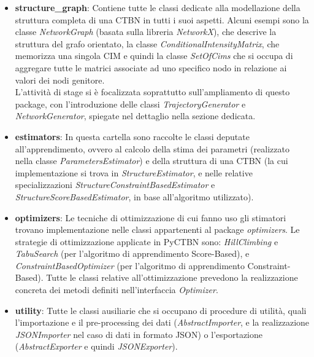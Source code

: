  \begin{itemize}
    \item \textbf{structure\_graph}: Contiene tutte le classi dedicate alla modellazione della struttura completa di una
      CTBN in tutti i suoi aspetti. Alcuni esempi sono la classe \textit{NetworkGraph} (basata sulla libreria \textit{NetworkX}),
      che descrive la struttura del grafo orientato, la classe \textit{ConditionalIntensityMatrix}, che
      memorizza una singola CIM e quindi la classe \textit{SetOfCims} che si occupa di aggregare
      tutte le matrici associate ad uno specifico nodo in relazione ai valori dei nodi genitore.\\
      L'attività di stage si è focalizzata soprattutto sull'ampliamento di questo package, con
      l'introduzione delle classi \textit{TrajectoryGenerator} e \textit{NetworkGenerator}, spiegate nel
      dettaglio nella sezione dedicata.
      
    \item \textbf{estimators}: In questa cartella sono raccolte le classi deputate all'apprendimento,
      ovvero al calcolo della stima dei parametri (realizzato nella classe \textit{ParametersEstimator}) e della struttura di una CTBN
      (la cui implementazione si trova in \textit{StructureEstimator}, e nelle relative specializzazioni \textit{StructureConstraintBasedEstimator} e
      \textit{StructureScoreBasedEstimator}, in base all'algoritmo utilizzato).

    \item \textbf{optimizers}: Le tecniche di ottimizzazione di cui fanno uso gli stimatori trovano
      implementazione nelle classi appartenenti al package \textit{optimizers}. 
      Le strategie di ottimizzazione applicate in PyCTBN sono: \textit{HillClimbing} e \textit{TabuSearch} (per l'algoritmo di apprendimento Score-Based),
      e \textit{ConstraintBasedOptimizer} (per l'algoritmo di apprendimento Constraint-Based). 
      Tutte le classi relative all'ottimizzazione prevedono la realizzazione concreta dei metodi definiti nell'interfaccia \textit{Optimizer}.
    
    \item \textbf{utility}: Tutte le classi ausiliarie che si occupano di procedure di utilità,
      quali l'importazione e il pre-processing dei dati (\textit{AbstractImporter}, e la realizzazione
      \textit{JSONImporter} nel caso di dati in formato JSON) o l'esportazione (\textit{AbstractExporter} e quindi \textit{JSONExporter}).   
  \end{itemize}

